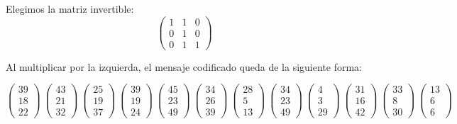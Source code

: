 \documentclass[12pt,a4paper]{article}
\begin{document}
Elegimos la matriz invertible:
$$\left(\begin{array}{ccc}1&1&0\\0&1&0\\0&1&1\end{array}\right)$$

Al multiplicar por la izquierda, el mensaje codificado queda de la siguiente forma:

{\tiny $$\left(\begin{array}{c}39\\18\\22\end{array}\right)~\left(\begin{array}{c}43\\21\\32\end{array}\right)~\left(\begin{array}{c}25\\19\\37\end{array}\right)~\left(\begin{array}{c}39\\19\\24\end{array}\right)~\left(\begin{array}{c}45\\23\\49\end{array}\right)~\left(\begin{array}{c}34\\26\\39\end{array}\right)~\left(\begin{array}{c}28\\5\\13\end{array}\right)~\left(\begin{array}{c}34\\23\\49\end{array}\right)~\left(\begin{array}{c}4\\3\\29\end{array}\right)~\left(\begin{array}{c}31\\16\\42\end{array}\right)~\left(\begin{array}{c}33\\8\\30\end{array}\right)~\left(\begin{array}{c}13\\6\\6\end{array}\right)$$}
\end{document}
